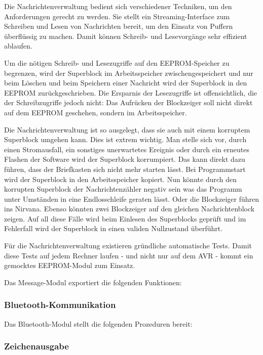\documentclass[ngerman]{article}
\begin{document}
Die Nachrichtenverwaltung bedient sich verschiedener Techniken, um
den Anforderungen gerecht zu werden. Sie stellt ein Streaming-Interface
zum Schreiben und Lesen von Nachrichten bereit, um den Einsatz von
Puffern überflüssig zu machen. Damit können Schreib- und Lesevorgänge
sehr effizient ablaufen.

Um die nötigen Schreib- und Lesezugriffe auf den EEPROM-Speicher zu begrenzen, wird der Superblock im Arbeitsspeicher
zwischengespeichert und nur beim Löschen und beim Speichern einer Nachricht
wird der Superblock in den EEPROM zurückgeschrieben. Die Ersparnis der
Lesezugriffe ist offensichtlich, die der Schreibzugriffe jedoch nicht:
Das Aufrücken der Blockzeiger soll nicht direkt auf dem EEPROM geschehen,
sondern im Arbeitsspeicher.

Die Nachrichtenverwaltung ist so ausgelegt, dass sie auch mit
einem korruptem Superblock umgehen kann. Dies ist extrem wichtig. Man
stelle sich vor, durch einen Stromausfall, ein sonstiges unerwartetes Ereignis
oder durch ein erneutes Flashen der Software wird der Superblock korrumpiert.
Das kann direkt dazu führen, dass der Briefkasten sich nicht mehr starten
lässt. Bei Programmstart wird der Superblock in den Arbeitsspeicher kopiert.
Nun könnte durch den korrupten Superblock der Nachrichtenzähler negativ sein
was das Programm unter Umständen in eine Endlosschleife geraten lässt. Oder
die Blockzeiger führen ins Nirvana. Ebenso könnten zwei Blockzeiger auf
den gleichen Nachrichtenblock zeigen. Auf all diese Fälle wird beim Einlesen
des Superblocks geprüft und im Fehlerfall wird der Superblock in einen
validen Nullzustand überführt.

Für die Nachrichtenverwaltung existieren gründliche automatische Tests.
Damit diese Tests auf jedem Rechner laufen - und nicht nur auf dem AVR -
kommt ein gemocktes EEPROM-Modul zum Einsatz.

Das Message-Modul exportiert die folgenden Funktionen:




\subsubsection{Bluetooth-Kommunikation}

Das Bluetooth-Modul stellt die folgenden Prozeduren bereit:



\subsubsection{Zeichenausgabe}
\end{document}

